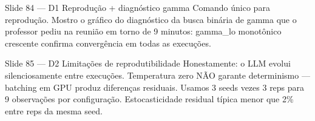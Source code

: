 \documentclass[aspectratio=169,10pt]{beamer}
\begin{document}
\begin{frame}{Slide 84 --- D1 Reprodu\c{c}\~ao + diagn\'ostico gamma}
\footnotesize
Comando \'unico para reprodu\c{c}\~ao. Mostro o gr\'afico do diagn\'ostico da busca bin\'aria de gamma que o professor pediu na reuni\~ao em torno de 9 minutos: gamma\_lo monot\^onico crescente confirma converg\^encia em todas as execu\c{c}\~oes.
\end{frame}

\begin{frame}{Slide 85 --- D2 Limita\c{c}\~oes de reprodutibilidade}
\footnotesize
Honestamente: o LLM evolui silenciosamente entre execu\c{c}\~oes. Temperatura zero N\~AO garante determinismo --- batching em GPU produz diferen\c{c}as residuais. Usamos 3 seeds vezes 3 reps para 9 observa\c{c}\~oes por configura\c{c}\~ao. Estocasticidade residual t\'ipica menor que 2\% entre reps da mesma seed.
\end{frame}
\end{document}
